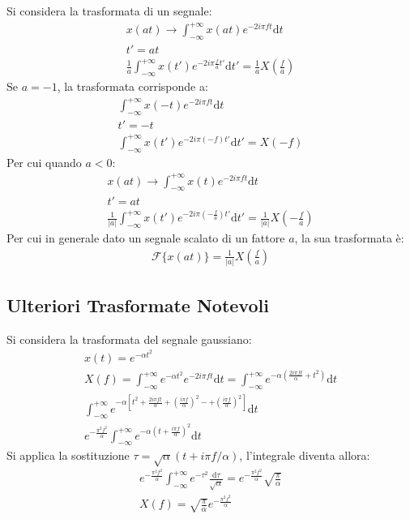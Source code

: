 \documentclass{article}
\newcommand{\df}{\mathrm{d}}
\numberwithin{equation}{subsection}
\begin{document}
Si considera la trasformata di un segnale:
\begin{gather*}
    x(at)\to\displaystyle\int_{-\infty}^{+\infty}x(at)e^{-2i\pi ft}\df t\\
    t'=at\\
    \displaystyle\frac{1}{a}\int_{-\infty}^{+\infty}x(t')e^{-2i\pi \frac{f}{a}t'}\df t'=\frac{1}{a}X\left(\frac{f}{a}\right)
\end{gather*}
Se $a=-1$, la trasformata corrisponde a:
\begin{gather*}
    \displaystyle\int_{-\infty}^{+\infty}x(-t)e^{-2i\pi ft}\df t\\
    t'=-t\\
    \displaystyle\int_{-\infty}^{+\infty}x(t')e^{-2i\pi(- f)t'}\df t'=X(-f)
\end{gather*}
Per cui quando $a<0$:
\begin{gather*}
    x(at)\to\displaystyle\int_{-\infty}^{+\infty}x(t)e^{-2i\pi ft}\df t\\
    t'=at\\
    \displaystyle\frac{1}{|a|}\int_{-\infty}^{+\infty}x(t')e^{-2i\pi \left(-\frac{f}{a}\right)t'}\df t'=\frac{1}{|a|}X\left(-\frac{f}{a}\right)
\end{gather*}
Per cui in generale dato un segnale scalato di un fattore $a$, la sua trasformata è:
\begin{gather*}
    \mathscr{F}\{x(at)\}=\displaystyle\frac{1}{|a|}X\left(\frac{f}{a}\right)
\end{gather*}

\subsection{Ulteriori Trasformate Notevoli}

Si considera la trasformata del segnale gaussiano:
\begin{gather*}
    x(t)=e^{-\alpha t^2}\\
    X(f)=\displaystyle\int_{-\infty}^{+\infty}e^{-\alpha t^2}e^{-2i\pi ft}\df t=\int_{-\infty}^{+\infty}e^{-\alpha\left(\frac{2i\pi ft}{\alpha} + t^2\right)}\df t\\
    \displaystyle\int_{-\infty}^{+\infty}e^{-\alpha\left[t^2+\frac{2i\pi ft}{\alpha}+\left(\frac{i\pi f}{\alpha}\right)^2-+\left(\frac{i\pi f}{\alpha}\right)^2\right]}\df t\\
    e^{-\frac{\pi^2f^2}{\alpha}}\displaystyle\int_{-\infty}^{+\infty}e^{-\alpha\left(t+\frac{i\pi f}{\alpha}\right)^2}\df t
\end{gather*}
Si applica la sostituzione $\tau=\sqrt{\alpha}(t+i\pi f/\alpha)$, l'integrale diventa allora:
\begin{gather*}
    e^{-\frac{\pi^2f^2}{\alpha}}\displaystyle\int_{-\infty}^{+\infty}e^{-\tau^2}\frac{\df\tau}{\sqrt{\alpha}}=e^{-\frac{\pi^2f^2}{\alpha}}\sqrt{\frac{\pi}{\alpha}}\\
    X(f)=\sqrt{\frac{\pi}{\alpha}}e^{-\frac{\pi^2f^2}{\alpha}}
\end{gather*}
\end{document}
